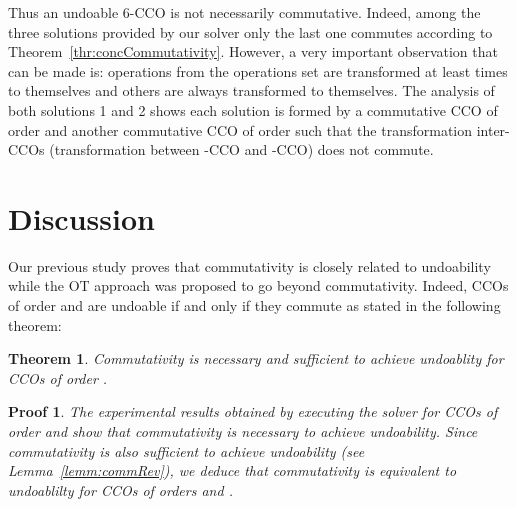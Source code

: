 \documentclass[submission,copyright,creativecommons]{eptcs}
\newtheorem*{proof*}{Proof}\newtheorem{theorem}{Theorem}
\begin{document}
Thus an undoable 6-CCO is not necessarily commutative. Indeed, among the three  solutions provided by our solver only the last one commutes according to Theorem~\ref{thr:concCommutativity}. However, a very important observation that can be made is:  operations from the operations set are transformed at least  times to themselves and  others are always transformed to themselves. The analysis of both solutions 1 and 2 shows each solution is formed by a commutative CCO of order  and another commutative CCO of order  such that the transformation inter-CCOs (transformation between -CCO and -CCO) does not commute. 


\section{Discussion}   

Our previous study proves that commutativity is closely related to undoability while the OT approach was proposed to go beyond commutativity.  
Indeed, CCOs of order  and  are undoable if and only if  they commute as stated in the following theorem: 
 \begin{theorem}\label{thr:Th2-4} 
Commutativity is necessary and sufficient to achieve undoablity for CCOs of order .
\end{theorem} 
\begin{proof*}
The experimental results obtained by executing the solver for CCOs of order  and  show   that commutativity is necessary to achieve undoability. Since commutativity is also sufficient to achieve undoability (see Lemma~\ref{lemm:commRev}), we deduce that commutativity is equivalent to undoablilty for CCOs of orders  and .
\end{proof*}
\end{document}
